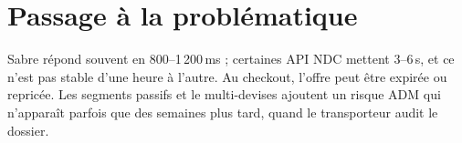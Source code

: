 \section{Passage à la problématique}

Sabre répond souvent en 800--1\,200\,ms ; certaines API NDC mettent 3--6\,s, et ce n'est pas stable d'une heure à l'autre. Au checkout, l'offre peut être expirée ou repricée. Les segments passifs et le multi-devises ajoutent un risque ADM qui n'apparaît parfois que des semaines plus tard, quand le transporteur audit le dossier.
